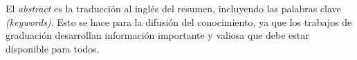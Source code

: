 El \textit{abstract} es la traducción al inglés del resumen, incluyendo las palabras clave \textit{(keywords)}. Esto se hace para la difusión del conocimiento, ya que los trabajos de graduación desarrollan información importante y valiosa que debe estar disponible para todos.

